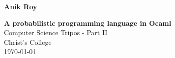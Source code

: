 \documentclass[12pt,notitlepage,a4paper]{report}
\begin{document}
\pagestyle{empty}

\hfill{\LARGE \bf Anik Roy}

\vspace*{\fill}
\begin{center}
	\huge
	\textbf{A probabilistic programming language in Ocaml}\\
	\vspace*{8mm}
	{\LARGE Computer Science Tripos - Part II} \\
	{\LARGE Christ's College} \\
	{\LARGE \today}
\end{center}
\vspace*{\fill}

\cleardoublepage


\setcounter{page}{1}
\pagestyle{plain}


\cleardoublepage


\setcounter{page}{1}
\pagestyle{headings}









\appendix




\end{document}
